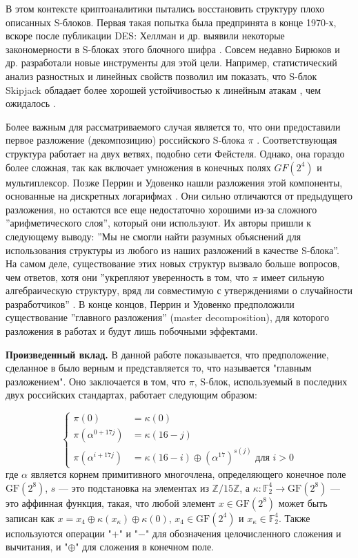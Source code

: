 В этом контексте криптоаналитики пытались восстановить структуру плохо описанных S-блоков. Первая такая попытка была предпринята в конце 1970-х, вскоре после публикации DES: Хеллман и др. выявили некоторые закономерности в S-блоках этого блочного шифра \cite{HMS76}. Совсем недавно Бирюков и др. разработали новые инструменты для этой цели. Например, статистический анализ разностных и линейных свойств позволил им показать, что S-блок Skipjack обладает более хорошей устойчивостью к линейным атакам \cite{Mat94}, чем ожидалось \cite{BP15}.

Более важным для рассматриваемого случая является то, что они предоставили первое разложение (декомпозицию) российского S-блока \(\pi\) \cite{BPU16a, BPU16b}. Соответствующая структура работает на двух ветвях, подобно сети Фейстеля. Однако, она гораздо более сложная, так как включает умножения в конечных полях \(GF(2^4)\) и мультиплексор. Позже Перрин и Удовенко нашли разложения этой компоненты, основанные на дискретных логарифмах \cite{PU16}. Они сильно отличаются от предыдущего разложения, но остаются все еще недостаточно хорошими из-за сложного ''арифметического слоя'', который они используют. Их авторы пришли к следующему выводу: ''Мы не смогли найти разумных объяснений для использования структуры из любого из наших разложений в качестве S-блока''. На самом деле, существование этих новых структур вызвало больше вопросов, чем ответов, хотя они ''укрепляют уверенность в том, что \(\pi\) имеет сильную алгебраическую структуру, вряд ли совместимую с утверждениями о случайности разработчиков'' \cite{PU16}. В конце концов, Перрин и Удовенко предположили существование ''главного разложения'' (master decomposition), для которого разложения в работах \cite{BPU16a} и \cite{PU16} будут лишь побочными эффектами.

\textbf{Произведенный вклад.} В данной работе показывается, что предположение, сделанное в \cite{PU16} было верным и представляется то, что называется "главным разложением". Оно заключается в том, что \(\pi\), S-блок, используемый в последних двух российских стандартах, работает следующим образом:

$$
\begin{cases}\pi(0) & =\kappa(0) \\ \pi\left(\alpha^{0+17 j}\right) & =\kappa(16-j) \\ \pi\left(\alpha^{i+17 j}\right) & =\kappa(16-i) \oplus\left(\alpha^{17}\right)^{s(j)} \text { для } i>0\end{cases}
$$
где \(\alpha\) является корнем примитивного многочлена, определяющего конечное поле \(\text{GF}(2^8)\), \(s\) — это подстановка на элементах из \( \mathbb{Z}/15\mathbb{Z} \), а \(\kappa: \mathbb{F}_2^4 \to \text{GF}(2^8)\) — это аффинная функция, такая, что любой элемент \(x \in \text{GF}(2^8)\) может быть записан как \(x = x_4 \oplus \kappa(x_\kappa) \oplus \kappa(0)\), \(x_4 \in \text{GF}(2^4)\) и \(x_\kappa \in \mathbb{F}_2^4\). Также используются операции "$+$" и "$-$" для обозначения целочисленного сложения и вычитания, и "$\oplus$" для сложения в конечном поле.

